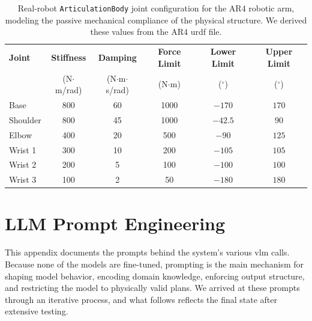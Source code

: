 \documentclass[
     12pt,
     a4paper,
     BCOR=10mm,
     DIV=14,
     listof=totoc,
     bibliography=totoc,
     parskip,
     twoside,
     headsepline
     ]{scrreprt}
\begin{document}
\begin{table}[ht]
	\centering
	\begin{tabular}{lccccc}
		\hline
		\textbf{Joint}       & \textbf{Stiffness}   & \textbf{Damping}        &
		\textbf{Force Limit} & \textbf{Lower Limit} & \textbf{Upper Limit}                                            \\
		                     & (N$\cdot$m/rad)      & (N$\cdot$m$\cdot$s/rad) & (N$\cdot$m) & ($^\circ$) & ($^\circ$) \\
		\hline
		Base                 & 800                  & 60                      & 1000        & $-170$     & $170$      \\
		Shoulder             & 800                  & 45                      & 1000        & $-42.5$    & $90$       \\
		Elbow                & 400                  & 20                      & 500         & $-90$      & $125$      \\
		Wrist 1              & 300                  & 10                      & 200         & $-105$     & $105$      \\
		Wrist 2              & 200                  & 5                       & 100         & $-100$     & $100$      \\
		Wrist 3              & 100                  & 2                       & 50          & $-180$     & $180$      \\
		\hline
	\end{tabular}
	\caption{Real-robot \texttt{ArticulationBody} joint configuration for the AR4 robotic arm, modeling the passive mechanical compliance of the physical structure. We derived these values from the AR4 \gls{urdf} file.}
	\label{tab:real_joint_config}
\end{table}

\chapter{LLM Prompt Engineering}\label{appendix:prompts}
This appendix documents the prompts behind the system's various \gls{vlm} calls. Because none of the models are fine-tuned, prompting is the main mechanism for shaping model behavior, encoding domain knowledge, enforcing output structure, and restricting the model to physically valid plans. We arrived at these prompts through an iterative process, and what follows reflects the final state after extensive testing.
\end{document}
